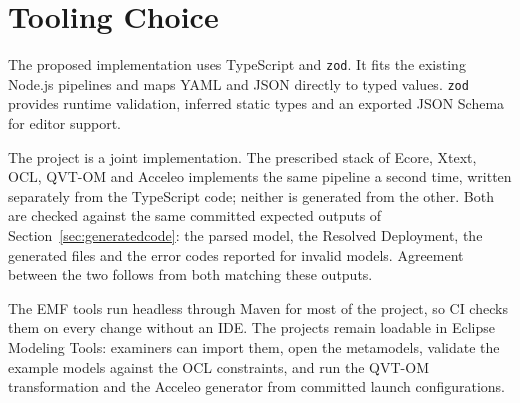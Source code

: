 \section{Tooling Choice}
\label{sec:tooling}

The proposed implementation uses TypeScript and \texttt{zod}. It fits the
existing Node.js pipelines and maps YAML and JSON directly to typed values.
\texttt{zod} provides runtime validation, inferred static types and an exported
JSON Schema for editor support.

The project is a joint implementation. The prescribed stack of Ecore, Xtext,
OCL, QVT-OM and Acceleo implements the same pipeline a second time, written
separately from the TypeScript code; neither is generated from the other. Both
are checked against the same committed expected outputs of
Section~\ref{sec:generatedcode}: the parsed model, the
Resolved Deployment, the generated files and the error codes reported for
invalid models. Agreement between the two follows from both matching these
outputs.

The EMF tools run headless through Maven for most of the project, so CI checks
them on every change without an IDE. The projects remain loadable in Eclipse
Modeling Tools: examiners can import them, open the metamodels, validate the
example models against the OCL constraints, and run the QVT-OM transformation
and the Acceleo generator from committed launch configurations.
